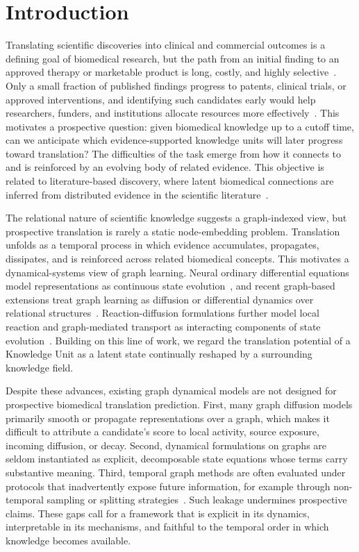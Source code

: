 \documentclass[conference]{IEEEtran}
\begin{document}
\section{Introduction}
Translating scientific discoveries into clinical and commercial outcomes is a defining goal of biomedical research, but the path from an initial finding to an approved therapy or marketable product is long, costly, and highly selective~\cite{fortunato2018science}. Only a small fraction of published findings progress to patents, clinical trials, or approved interventions, and identifying such candidates early would help researchers, funders, and institutions allocate resources more effectively~\cite{ahmadpoor2017dual}. This motivates a prospective question: given biomedical knowledge up to a cutoff time, can we anticipate which evidence-supported knowledge units will later progress toward translation? The difficulties of the task emerge from how it connects to and is reinforced by an evolving body of related evidence. This objective is related to literature-based discovery, where latent biomedical connections are inferred from distributed evidence in the scientific literature~\cite{swanson1986fish}.

The relational nature of scientific knowledge suggests a graph-indexed view, but prospective translation is rarely a static node-embedding problem. Translation unfolds as a temporal process in which evidence accumulates, propagates, dissipates, and is reinforced across related biomedical concepts. This motivates a dynamical-systems view of graph learning. Neural ordinary differential equations model representations as continuous state evolution~\cite{chen2018neural}, and recent graph-based extensions treat graph learning as diffusion or differential dynamics over relational structures~\cite{chamberlain2021grand,rusch2022graphcon}. Reaction-diffusion formulations further model local reaction and graph-mediated transport as interacting components of state evolution~\cite{eliasof2024graph}. Building on this line of work, we regard the translation potential of a Knowledge Unit as a latent state continually reshaped by a surrounding knowledge field.

Despite these advances, existing graph dynamical models are not designed for prospective biomedical translation prediction. First, many graph diffusion models primarily smooth or propagate representations over a graph, which makes it difficult to attribute a candidate's score to local activity, source exposure, incoming diffusion, or decay. Second, dynamical formulations on graphs are seldom instantiated as explicit, decomposable state equations whose terms carry substantive meaning. Third, temporal graph methods are often evaluated under protocols that inadvertently expose future information, for example through non-temporal sampling or splitting strategies~\cite{kapoor2023leakage}. Such leakage undermines prospective claims. These gaps call for a framework that is explicit in its dynamics, interpretable in its mechanisms, and faithful to the temporal order in which knowledge becomes available.
\end{document}
